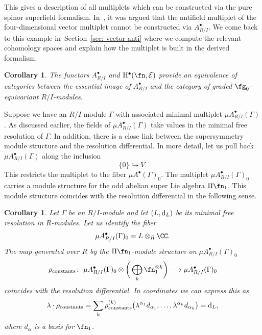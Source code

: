\documentclass[10pt,a4paper]{amsart}
\numberwithin{equation}{section}
\newtheorem{cor}[thm]{Corollary}
\def\cE{\mathcal E}\def\cF{\mathcal F}\def\cG{\mathcal G}\def\cH{\mathcal H}
\def\d{{\rm d}}
\begin{document}
This gives a description of all multiplets which can be constructed via the pure spinor superfield formalism. In~\cite{perspectives}, it was argued that the antifield multiplet of the four-dimensional vector multiplet cannot be constructed via $A^\bullet_{R/I}$. We come back to this example in~Section~\ref{sec: vector anti} where we compute the relevant cohomology spaces and explain how the multiplet is built in the derived formalism.

\begin{cor}
	The functors $A^\bullet_{R/I}$ and $\mathrm H^\bullet(\fn , \cE)$ provide an equivalence of categories between the essential image of $A^\bullet_{R/I}$ and the category of graded $\fg_0$-equivariant $R/I$-modules.
\end{cor}

Suppose we have an $R/I$-module $\Gamma$ with associated minimal multiplet $\mu A_{R/I}^\bullet(\Gamma)$. As discussed earlier, the fields of $\mu A_{R/I}^\bullet(\Gamma)$ take values in the minimal free resolution of $\Gamma$. In addition, there is a close link between the supersymmetry module structure and the resolution differential. In more detail, let us pull back $\mu A_{R/I}^\bullet(\Gamma)$ along the inclusion
\begin{equation*}
\{0\} \hookrightarrow V .
\end{equation*}
This restricts the multiplet to the fiber $\mu A^\bullet(\Gamma)_0$. The multiplet $\mu A_{R/I}^\bullet(\Gamma)_0$ carries a module structure for the odd abelian super Lie algebra $\Pi \fn_1$. This module structure coincides with the resolution differential in the following sense.

\begin{cor} \label{cor: susy trafo}
	Let $\Gamma$ be an $R/I$-module and let $(L,\d_L)$ be its minimal free resolution in $R$-modules. Let us identify the fiber
	\begin{equation*}
	\mu A_{R/I}^\bullet(\Gamma)_0 = L \otimes_R \CC.
	\end{equation*}
	The map generated over $R$ by the $\Pi \fn_1$-module structure on $\mu A_{R/I}^\bullet(\Gamma)_0$
	\begin{equation*}
	\rho_{\mathrm{constants}} \colon \ \mu A^\bullet_{R/I}(\Gamma)_0 \otimes \bigg(\bigoplus_k \fn_1^{\otimes k}\bigg) \longrightarrow \mu A^\bullet_{R/I}(\Gamma)_0
	\end{equation*}
	coincides with the resolution differential. In coordinates we can express this as
	\begin{equation*}
	\lambda \cdot \rho_{\mathrm{constants}} = \sum_k \rho_{\mathrm{constants}}^{(k)} \big(\lambda^{\alpha_1} d_{\alpha_1}, \dots , \lambda^{\alpha_k} d_{\alpha_k}\big) = \d_L,
	\end{equation*}
	where $d_\alpha$ is a basis for $\fn_1$.
\end{cor}
\end{document}
